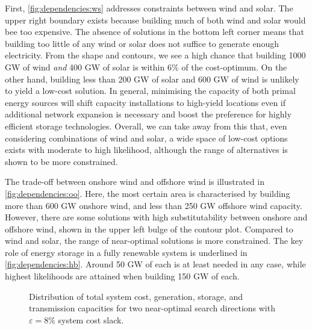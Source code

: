 First, \cref{fig:dependencies:ws} addresses constraints between wind and solar.
The upper right boundary exists because building much of both wind and solar would bee too expensive.
The absence of solutions in the bottom left corner means that
building too little of any wind or solar does not suffice to generate enough electricity.
From the shape and contours, we see a high chance
that building 1000 GW of wind \textit{and} 400 GW of solar is within 6\% of the cost-optimum.
On the other hand, building less than 200 GW of solar and 600 GW of wind is unlikely to yield a low-cost solution.
In general, minimising the capacity of both primal energy sources will shift capacity installations to
high-yield locations even if additional network expansion is necessary and boost
the preference for highly efficient storage technologies.
Overall, we can take away from this that, even considering combinations of wind and solar,
a wide space of low-cost options exists with moderate to high likelihood,
although the range of alternatives is shown to be more constrained.

The trade-off between onshore wind and offshore wind is illustrated in \cref{fig:dependencies:oo}.
Here, the most certain area is characterised by building more than 600 GW onshore wind,
and less than 250 GW offshore wind capacity.
However, there are some solutions with high substitutability between onshore and offshore wind,
shown in the upper left bulge of the contour plot.
Compared to wind and solar, the range of near-optimal solutions is more constrained.
The key role of energy storage in a fully renewable system is underlined in \cref{fig:dependencies:hb}.
Around 50 GW of each is at least needed in any case,
while highest likelihoods are attained when building 150 GW of each.

\begin{figure}
    \noindent{}
    \caption{
      Distribution of total system cost, generation, storage, and transmission capacities
      for two near-optimal search directions with $\varepsilon=8\%$ system cost slack.
    }
    \label{fig:nearviolin}
\end{figure}

